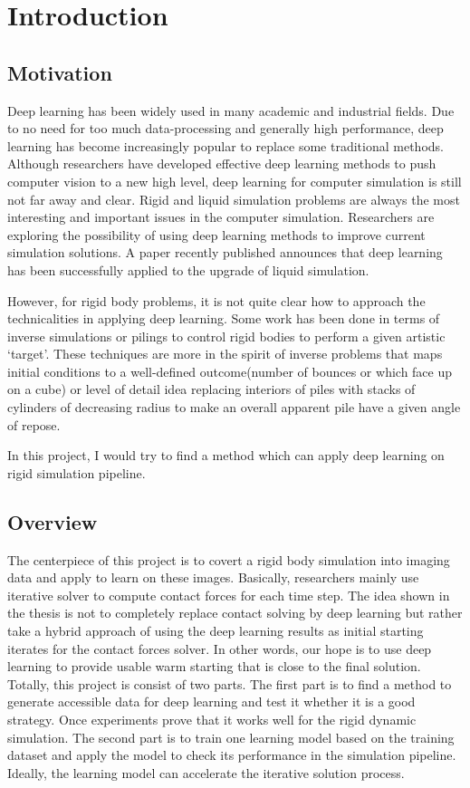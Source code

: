 \chapter{Introduction}

\section{Motivation}

    Deep learning has been widely used in many academic and industrial fields. Due to no need for too much data-processing and generally high performance, deep learning has become increasingly popular to replace some traditional methods. Although researchers have developed effective deep learning methods to push computer vision to a new high level, deep learning for computer simulation is still not far away and clear. Rigid and liquid simulation problems are always the most interesting and important issues in the computer simulation. Researchers are exploring the possibility of using deep learning methods to improve current simulation solutions. A paper recently published announces that deep learning has been successfully applied to the upgrade of liquid simulation\cite{CNNFluid2016}.

    However, for rigid body problems, it is not quite clear how to approach the technicalities in applying deep learning. Some work has been done in terms of inverse simulations or pilings to control rigid bodies to perform a given artistic `target'. These techniques are more in the spirit of inverse problems that maps initial conditions to a well-defined outcome(number of bounces or which face up on a cube) or level of detail idea replacing interiors of piles with stacks of cylinders of decreasing radius to make an overall apparent pile have a given angle of repose.

    In this project, I would try to find a method which can apply deep learning on rigid simulation pipeline.

\section{Overview}
        The centerpiece of this project is to covert a rigid body simulation into imaging data and apply to learn on these images. Basically, researchers mainly use iterative solver to compute contact forces for each time step. The idea shown in the thesis is not to completely replace contact solving by deep learning but rather take a hybrid approach of using the deep learning results as initial starting iterates for the contact forces solver. In other words, our hope is to use deep learning to provide usable warm starting that is close to the final solution. Totally, this project is consist of two parts. The first part is to find a method to generate accessible data for deep learning and test it whether it is a good strategy. Once experiments prove that it works well for the rigid dynamic simulation. The second part is to train one learning model based on the training dataset and apply the model to check its performance in the simulation pipeline. Ideally, the learning model can accelerate the iterative solution process.

